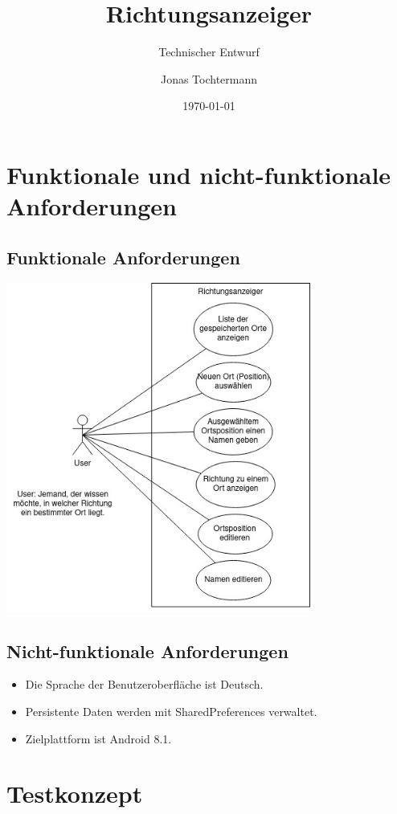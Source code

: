 \documentclass[12pt,a4paper]{scrartcl}
\title{Richtungsanzeiger}
\subtitle{Technischer Entwurf}
\author{Jonas Tochtermann}
\date{\today}
\begin{document}
\maketitle

\section{Funktionale und nicht-funktionale Anforderungen}

\subsection{Funktionale Anforderungen}

\includegraphics[width=10.0cm]{../UseCase.jpg}

\subsection{Nicht-funktionale Anforderungen}

\begin{itemize}
  \item Die Sprache der Benutzeroberfläche ist Deutsch.
  \item Persistente Daten werden mit SharedPreferences verwaltet.
  \item Zielplattform ist Android 8.1.
\end{itemize}

\section{Testkonzept}
\end{document}
